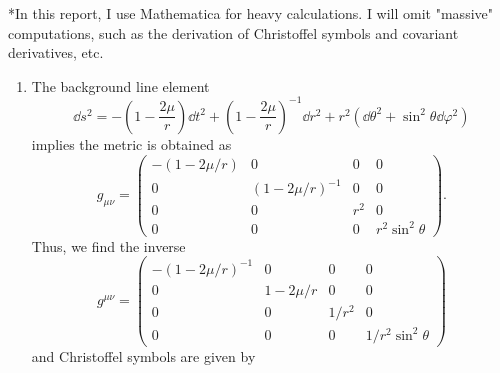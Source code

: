 \documentclass[a4paper,pdftex,10pt]{article}
\begin{document}
\maketitle

*In this report, I use Mathematica for heavy calculations. I will omit "massive" computations, such as the derivation of Christoffel symbols and covariant derivatives, etc.

\begin{enumerate}
  \item
        The background line element
        \begin{equation}
          \dd s^2
          =
          -
          \left( 1-\frac{2\mu}{r} \right)\dd t^2
          +
          \left( 1-\frac{2\mu}{r} \right)^{-1}\dd r^2
          +
          r^2
          (\dd\theta^2+\sin^2\theta\dd\varphi^2)
        \end{equation}
        implies the metric is obtained as
        \begin{equation}
          g_{\mu\nu}
          =
          \begin{pmatrix}
            -\left( 1-2\mu/r \right) & 0                            & 0   & 0               \\
            0                        & \left( 1-2\mu/r \right)^{-1} & 0   & 0               \\
            0                        & 0                            & r^2 & 0               \\
            0                        & 0                            & 0   & r^2\sin^2\theta
          \end{pmatrix}
          .
        \end{equation}
        Thus, we find the inverse
        \begin{equation}
          g^{\mu\nu}
          =
          \begin{pmatrix}
            -(1-2\mu/r)^{-1} & 0        & 0     & 0                  \\
            0                & 1-2\mu/r & 0     & 0                  \\
            0                & 0        & 1/r^2 & 0                  \\
            0                & 0        & 0     & 1/r^2 \sin^2\theta
          \end{pmatrix}
        \end{equation}
        and Christoffel symbols are given by
        \begin{equation}

\end{equation}
\end{enumerate}
\end{document}
